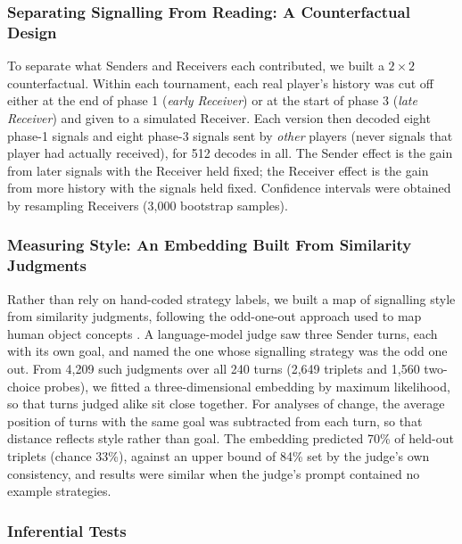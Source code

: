 \documentclass[stu,11pt,floatsintext,donotrepeattitle]{apa7}
\begin{document}
\subsubsection{Separating Signalling From Reading: A Counterfactual Design}

To separate what Senders and Receivers each contributed, we built a $2 \times 2$ counterfactual. Within each tournament, each real player's history was cut off either at the end of phase 1 (\emph{early Receiver}) or at the start of phase 3 (\emph{late Receiver}) and given to a simulated Receiver. Each version then decoded eight phase-1 signals and eight phase-3 signals sent by \emph{other} players (never signals that player had actually received), for 512 decodes in all. The Sender effect is the gain from later signals with the Receiver held fixed; the Receiver effect is the gain from more history with the signals held fixed. Confidence intervals were obtained by resampling Receivers (3,000 bootstrap samples).

\subsubsection{Measuring Style: An Embedding Built From Similarity Judgments}

Rather than rely on hand-coded strategy labels, we built a map of signalling style from similarity judgments, following the odd-one-out approach used to map human object concepts \parencite{hebart2020}. A language-model judge saw three Sender turns, each with its own goal, and named the one whose signalling strategy was the odd one out. From 4,209 such judgments over all 240 turns (2,649 triplets and 1,560 two-choice probes), we fitted a three-dimensional embedding by maximum likelihood, so that turns judged alike sit close together. For analyses of change, the average position of turns with the same goal was subtracted from each turn, so that distance reflects style rather than goal. The embedding predicted 70\% of held-out triplets (chance 33\%), against an upper bound of 84\% set by the judge's own consistency, and results were similar when the judge's prompt contained no example strategies.

\subsubsection{Inferential Tests}
\end{document}
